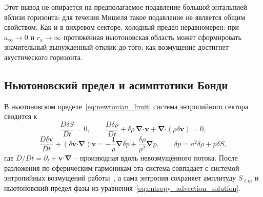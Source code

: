 \documentclass[12pt,a4paper,preprint,nopreprintline]{elsarticle}
\begin{document}
Этот вывод не опирается на предполагаемое подавление большой энтальпией вблизи горизонта: для течения Мишеля такое подавление не является общим свойством. Как и в вихревом секторе, холодный предел неравномерен: при $a_{\infty}\rightarrow0$ и $r_{\mathrm{a}}\rightarrow\infty$ протяжённая ньютоновская область может сформировать значительный вынужденный отклик до того, как возмущение достигнет акустического горизонта.

\subsection{Ньютоновский предел и асимптотики Бонди}
\label{sec:newtonian_bondi_entropy}

В ньютоновском пределе~\eqref{eq:newtonian_limit} система энтропийного сектора сводится к
\begin{equation}
    \frac{D\delta S}{Dt}=0,
    \qquad
    \frac{D\delta\rho}{Dt}
    +\delta\rho\,\boldsymbol{\nabla}\boldsymbol{\cdot}\boldsymbol{v}
    +\boldsymbol{\nabla}\boldsymbol{\cdot}
        (\rho\delta\boldsymbol{v})=0,
    \label{eq:entropy_newtonian_continuity}
\end{equation}
\begin{equation}
    \frac{D\delta\boldsymbol{v}}{Dt}
    +
    (\delta\boldsymbol{v}\boldsymbol{\cdot}\boldsymbol{\nabla})
        \boldsymbol{v}
    =
    -\frac{1}{\rho}\boldsymbol{\nabla}\delta p
    +\frac{\delta\rho}{\rho^{2}}\boldsymbol{\nabla}p,
    \qquad
    \delta p=a^{2}\delta\rho+p\delta S,
    \label{eq:entropy_newtonian_euler}
\end{equation}
где $D/Dt=\partial_{t}+\boldsymbol{v}\boldsymbol{\cdot}\boldsymbol{\nabla}$ -- производная вдоль невозмущённого потока. После разложения по сферическим гармоникам эта система совпадает с системой энтропийных возмущений работы~\cite{KovalenkoIG_EreminMA_SpatialInstabilityOfSphericalAccretion_1998}, а сама энтропия сохраняет амплитуду $S_{\ell m}$ и ньютоновский предел фазы из уравнения~\eqref{eq:entropy_advection_solution}.
\end{document}
